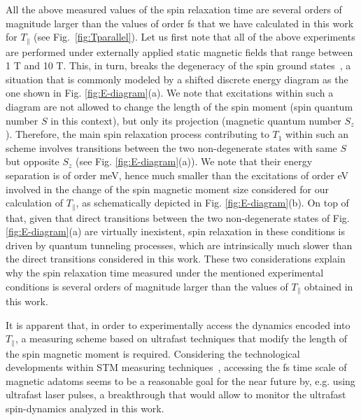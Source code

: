 \documentclass[prb,footinbib,showpacs,twocolumn,amsmath,amssymb]{revtex4}
\begin{document}
All the above measured values of the spin relaxation time 
are several orders of magnitude larger 
than the values of order fs  that we have calculated
in this work for $T_{\parallel}$ (see Fig.~\ref{fig:Tparallel}).
Let us first note that all of the above experiments are performed under
externally applied static magnetic fields that range between 1 T and 10 T. This, in turn,
breaks the degeneracy of the spin ground states~\cite{loth_measurement_2010},  
a situation that is commonly modeled by 
a shifted discrete energy diagram as the one shown in Fig. \ref{fig:E-diagram}(a). 
We note that excitations within such a diagram 
are not allowed to change the length of the spin moment
(spin quantum number $S$ in this context), 
but only its projection (magnetic quantum number $S_{z}$).
Therefore, the main spin relaxation process contributing to $T_{1}$
within such an scheme involves transitions between the two non-degenerate states
with same $S$ but opposite $S_{z}$ (see Fig. \ref{fig:E-diagram}(a)).
We note that their energy separation is of order meV, hence much smaller than the 
excitations of order eV involved in the change of the spin magnetic moment size
considered for 
our calculation of $T_{\parallel}$, as schematically depicted in Fig.  \ref{fig:E-diagram}(b).
On top of that, given that direct transitions between the two non-degenerate 
states of Fig.  \ref{fig:E-diagram}(a) are virtually inexistent, 
spin relaxation in these conditions is  driven by quantum tunneling processes,
which are intrinsically much slower than the direct transitions considered in this work. 
These two considerations explain why the spin relaxation time  measured
under the mentioned experimental conditions
is several orders of magnitude larger than the values of $T_{\parallel}$ obtained
in this work.

It is apparent that, in order to experimentally 
access the dynamics encoded into  $T_{\parallel}$, 
a measuring scheme based on ultrafast techniques that modify the
length of the spin magnetic moment is required. 
Considering the technological developments within 
STM measuring techniques~\cite{kruger_attosecond_2011,cocker_ultrafast_2013,cocker_tracking_2016}, 
accessing the fs time scale of magnetic adatoms seems to be a reasonable goal
for the near future by, e.g. using ultrafast laser pulses, 
a breakthrough that would allow to monitor the ultrafast spin-dynamics
analyzed in this work. 
\end{document}
